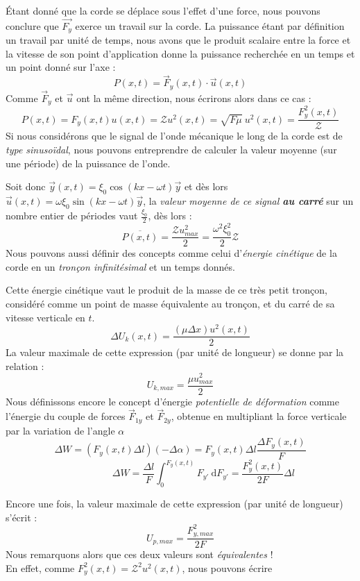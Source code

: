 Étant donné que la corde se déplace sous l'effet d'une force, nous pouvons conclure que $\vec{F_{y}}$ exerce un travail sur la corde. 
La puissance étant par définition un travail par unité de temps, nous avons que le produit scalaire entre la force et la vitesse de son point d'application 
donne la puissance recherchée en un temps et un point donné sur l'axe :
\[P(x,t) = \vec{F}_{y}(x,t) \cdot \vec{u}(x,t) \]
Comme $\vec{F}_{y}$ et $\vec{u}$ ont la même direction, nous écrirons alors dans ce cas : 
\[ P(x,t) = F_{y}(x,t) u(x,t) = \mathcal{Z} u^{2}(x,t) = \sqrt{F \mu}\: u^{2}(x,t) = \frac{F_{y}^2(x,t)}{\mathcal{Z}}\]
Si nous considérons que le signal de l'onde mécanique le long de la corde est de \textit{type sinusoïdal}, 
nous pouvons entreprendre de calculer la valeur moyenne (sur une période) de la puissance de l'onde. 

Soit donc $\vec{y}(x,t) = \xi_{0} \cos(kx-\omega t) \vec{y}$ et dès lors $\vec{u}(x,t) = \omega \xi_{0} \sin(kx-\omega t) \vec{y}$, la \textit{valeur moyenne de ce signal \textbf{au carré}} sur un nombre entier de périodes vaut $\frac{\xi_{0}}{2}$, dès lors : 
\[ \overline{P(x,t)} = \frac{\mathcal{Z} u^{2}_{max}}{2} = \frac{\omega^{2} \xi_{0}^{2}}{2} \mathcal{Z}\]
Nous pouvons aussi définir des concepts comme celui d'\textit{énergie cinétique} de la corde en un \textit{tronçon infinitésimal} et un temps donnés.

Cette énergie cinétique vaut le produit de la masse de ce très petit tronçon, considéré comme un point de masse équivalente au tronçon, et du carré de sa vitesse
verticale en $t$. 
\[\Delta U_{k}(x,t) = \frac{(\mu \Delta x)u^{2}(x,t)}{2} \] 
La valeur maximale de cette expression (par unité de longueur) se donne par la relation : 
\[U_{k,max} = \frac{\mu u_{max}^{2}}{2}\]
Nous définissons encore le concept d'énergie \textit{potentielle de déformation} comme l'énergie du couple de forces $\vec{F}_{1y}$ et $\vec{F}_{2y}$, obtenue en multipliant la force verticale par la variation de l'angle $\alpha$
\[\Delta W = (F_{y}(x,t) \Delta l)(-\Delta \alpha)= F_{y}(x,t) \Delta l \frac{\Delta F_{y}(x,t)}{F} \]
\[\hspace{2cm} \Delta W = \frac{\Delta l}{F} \int_{0}^{F_{y}(x,t)} F_{y'} \ \mathrm{d}F_{y'} = \frac{F_{y}^{2}(x,t)}{2F}\Delta l \]

Encore une fois, la valeur maximale de cette expression (par unité de longueur) s'écrit :
\[U_{p,max} = \frac{F_{y,max}^{2}}{2F}\]
Nous remarquons alors que ces deux valeurs sont \textit{équivalentes} ! 
\\ En effet, comme $F_{y}^{2}(x,t)  = \mathcal{Z}^{2} u^{2}(x,t)$, nous pouvons écrire 

